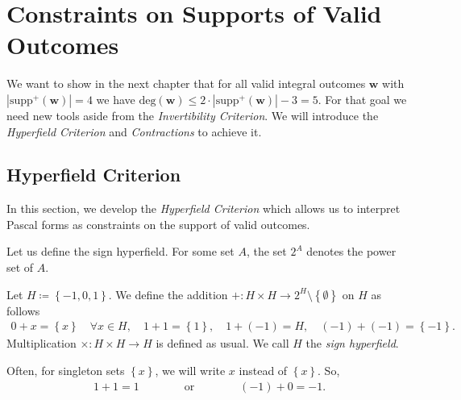 
\chapter{Constraints on Supports of Valid Outcomes}

We want to show in the next chapter that for all valid integral outcomes \( \mathbf w \) with \( |\mathrm{supp}^+(\mathbf w)| = 4 \) we have \( \mathrm{deg}(\mathbf w) \leq 2 \cdot |\mathrm{supp}^+(\mathbf w)| - 3 = 5 \).
For that goal we need new tools aside from the \emph{Invertibility Criterion}. We will introduce the \emph{Hyperfield Criterion} and \emph{Contractions} to achieve it.

\section{Hyperfield Criterion}

In this section, we develop the \emph{Hyperfield Criterion} which allows us to interpret Pascal forms as constraints on the support of valid outcomes.

Let us define the {sign hyperfield}. For some set \( A \), the set \( 2^A \) denotes the power set of \( A \).

\begin{definition}
    Let \( H \coloneqq \left\{ -1, 0, 1 \right\} \). We define the addition \( + : H \times H \to 2^H \setminus \left\{ \emptyset \right\} \) on \( H \) as follows
    \begin{align*}
        0 + x = \left\{ x \right\}  \quad \forall x \in H, \quad 1 + 1 = \left\{ 1 \right\}, \quad 1 + (-1) = H, \quad (-1) + (-1) = \left\{ -1 \right\}.
    \end{align*}
    Multiplication \( \times : H \times H \to H \) is defined as usual. We call \( H \) the \emph{sign hyperfield}.
\end{definition}

Often, for singleton sets \( \left\{ x \right\} \), we will write \( x \) instead of \( \left\{ x \right\} \). So, 
\begin{align*}
    1 + 1 = 1 \qquad \qquad \text{or} \qquad \qquad (-1) + 0 = -1.
\end{align*}


